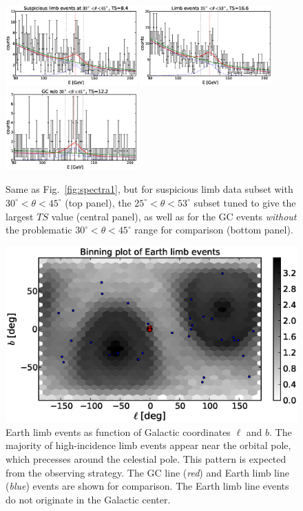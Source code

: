 \documentclass[aps,twocolumn,prd,superscriptaddress,showpacs,nofootinbib,fixfloat]{revtex4}
\begin{document}
\begin{figure}
  \centering
  \includegraphics[width=0.45\textwidth]{plots/counts_suspiciousLimb.eps}
  \includegraphics[width=0.45\textwidth]{plots/counts_suspiciousLimb_tuned.eps}
  \includegraphics[width=0.45\textwidth]{plots/counts_GC_wo3045.eps}
  \caption{Same as Fig.~\ref{fig:spectra1}, but for
  suspicious limb data subset with
  $30^\circ<\theta<45^\circ$ (top panel),
  the $25^\circ<\theta<53^\circ$ subset tuned to give the largest $TS$ value (central panel),
  as well as for the
  GC events \emph{without} the problematic
  $30^\circ<\theta<45^\circ$ range for comparison (bottom panel).}
  \label{fig:spectra2}
\end{figure}

\begin{figure}
  \centering
  \includegraphics[width=1.0\linewidth]{plots/limb_l_b.eps}
  \caption{Earth limb events as function of Galactic coordinates $\ell$
  and $b$.  The majority of high-incidence limb events appear near the orbital
  pole, which precesses around the celestial pole. This pattern is expected
  from the observing strategy.  The GC line (\emph{red}) and Earth limb line
  (\emph{blue}) events are shown for comparison. The Earth limb line events do
  not originate in the Galactic center.}
  \label{fig:l-b}
\end{figure}
\end{document}
